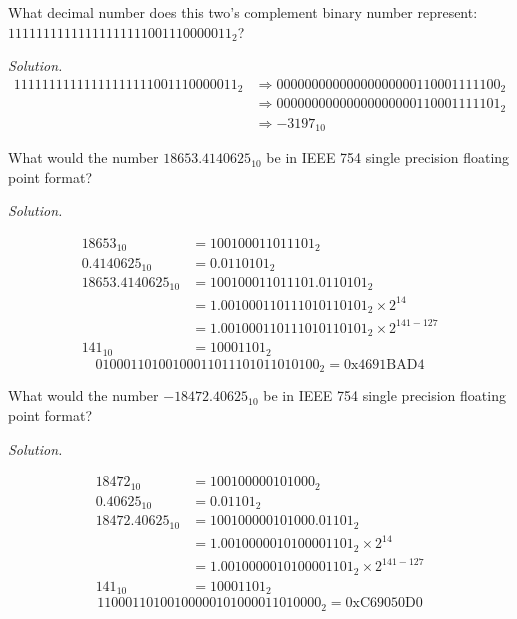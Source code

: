 \documentclass[12pt]{article}
\newenvironment{problem}[2][Problem]{\begin{trivlist}
\item[\hskip \labelsep {\bfseries #1}\hskip \labelsep {\bfseries
#2.}]}{\end{trivlist}}
\begin{document}
\begin{problem}{4}
What decimal number does this two's complement binary number represent: $1111 1111 1111 1111 1111 0011 1000 0011_2$?
\end{problem}

\textit{Solution.}
\begin{align*}
    1111 1111 1111 1111 1111 0011 1000 0011_2 & \Longrightarrow 0000 0000 0000 0000 0000 1100 0111 1100_2 \tag*{(Invert bits)} \\&\Longrightarrow 0000 0000 0000 0000 0000 1100 0111 1101_2 \tag*{(Add one)} \\
    &\Longrightarrow -3197_{10}
\end{align*}

\begin{problem}{5}
What would the number $18653.4140625_{10}$ be in IEEE 754 single precision floating point format?
\end{problem}

\textit{Solution.}

\begin{align*}
    18653_{10} &= 100100011011101_2 \\
    0.4140625_{10} &= 0.0110101_2 \\
    18653.4140625_{10} &= 100100011011101.0110101_2 \tag*{(Decimal to binary)} \\
    &= 1.001000110111010110101_2 \times 2^{14} \tag*{(Normalized format)} \\
    &= 1.001000110111010110101_2 \times 2^{141 - 127} \tag*{(With bias)} \\
    141_{10} &= 10001101_2 \tag*{(Convert exponent to binary)}
\end{align*}
$$01000110100100011011101011010100_2 = \text{0x4691BAD4}$$

\begin{problem}{6}
What would the number $-18472.40625_{10}$ be in IEEE 754 single precision floating point format?
\end{problem}

\textit{Solution.}

\begin{align*}
    18472_{10} &= 100100000101000_2 \\
    0.40625_{10} &= 0.01101_2 \\
    18472.40625_{10} &= 100100000101000.01101_2 \tag*{(Decimal to binary)} \\
    &= 1.0010000010100001101_2 \times 2^{14} \tag*{(Normalized format)} \\
    &= 1.0010000010100001101_2 \times 2^{141 - 127} \tag*{(With bias)} \\
    141_{10} &= 10001101_2 \tag*{(Convert exponent to binary)}
\end{align*}
$$11000110100100000101000011010000_2 = \text{0xC69050D0}$$
\end{document}
